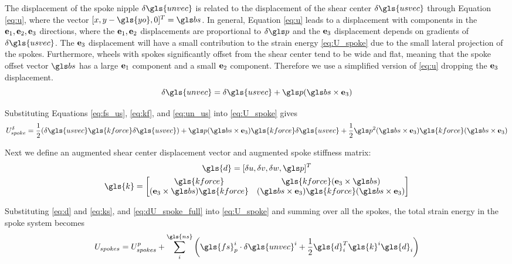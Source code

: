 \documentclass[\rootdir/thesis.tex]{subfiles}
\begin{document}
The displacement of the spoke nipple $\delta\gls{unvec}$ is related to the displacement of the shear center $\delta\gls{usvec}$ through Equation \eqref{eq:u}, where the vector $[\x,\y-\gls{yo},0]^T = \bs$. In general, Equation \eqref{eq:u} leads to a displacement with components in the $\mathbf{e}_1,\mathbf{e}_2,\mathbf{e}_3$ directions, where the $\mathbf{e}_1,\mathbf{e}_2$ displacements are proportional to $\delta\p$ and the $\mathbf{e}_3$ displacement depends on gradients of $\delta\gls{usvec}$. The $\mathbf{e}_3$ displacement will have a small contribution to the strain energy \eqref{eq:U_spoke} due to the small lateral projection of the spokes. Furthermore, wheels with spokes significantly offset from the shear center tend to be wide and flat, meaning that the spoke offset vector $\bs$ has a large $\mathbf{e}_1$ component and a small $\mathbf{e}_2$ component. Therefore we use a simplified version of \eqref{eq:u} dropping the $\mathbf{e}_3$ displacement.
\begin{equation}
\label{eq:un_us}
\delta\gls{unvec} = \delta\gls{usvec} + \p (\bs \times \eh)
\end{equation}

Substituting Equations \eqref{eq:fs_us}, \eqref{eq:kf}, and \eqref{eq:un_us} into \eqref{eq:U_spoke} gives
\begin{equation}
\label{eq:dU_spoke_full}
U_{spoke}^{\delta} = \frac{1}{2}(\delta\gls{usvec} \gls{kforce} \delta\gls{usvec}) +
    \p(\bs\times\eh)\gls{kforce}\delta\gls{usvec} +
    \frac{1}{2}\p^2(\bs\times\eh)\gls{kforce}(\bs\times\eh)
\end{equation}

Next we define an augmented shear center displacement vector and augmented spoke stiffness matrix:
\begin{gather}
\gls{d} = [\delta u, \delta v, \delta w, \p]^T\label{eq:d}\\
\gls{k} =
\begin{bmatrix}
\gls{kforce}                & \gls{kforce} (\eh\times\bs)\\
(\eh\times\bs) \gls{kforce} & (\bs\times\eh)\gls{kforce}(\bs\times\eh)
\end{bmatrix}\label{eq:ks}
\end{gather}

Substituting \eqref{eq:d} and \eqref{eq:ks}, and \eqref{eq:dU_spoke_full} into \eqref{eq:U_spoke} and summing over all the spokes, the total strain energy in the spoke system becomes
\begin{equation}
\label{eq:U_spokes}
U_{spokes} = U_{spokes}^p + \sum_i^{\gls{ns}} \left(\gls{fs}_p^i \cdot \delta\gls{unvec}^i +
    \frac{1}{2}\gls{d}_i^T \gls{k}^i \gls{d}_i\right)
\end{equation}
\end{document}
